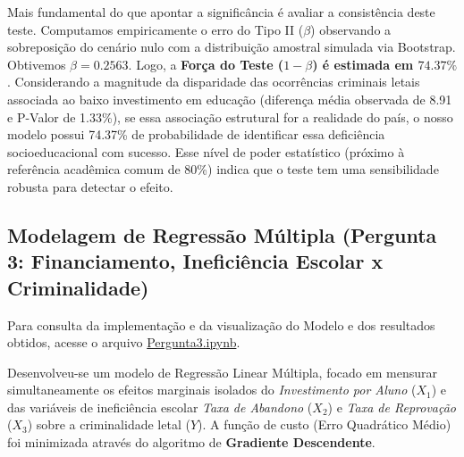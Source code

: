 \documentclass[10pt]{article}
\begin{document}
Mais fundamental do que apontar a significância é avaliar a consistência deste teste. Computamos empiricamente o erro do Tipo II ($\beta$) observando a sobreposição do cenário nulo com a distribuição amostral simulada via Bootstrap. Obtivemos $\beta = 0.2563$. Logo, a \textbf{Força do Teste ($1 - \beta$) é estimada em $74.37\%$}. Considerando a magnitude da disparidade das ocorrências criminais letais associada ao baixo investimento em educação (diferença média observada de 8.91 e P-Valor de 1.33\%), se essa associação estrutural for a realidade do país, o nosso modelo possui 74.37\% de probabilidade de identificar essa deficiência socioeducacional com sucesso. Esse nível de poder estatístico (próximo à referência acadêmica comum de 80\%) indica que o teste tem uma sensibilidade robusta para detectar o efeito.

\subsection{Modelagem de Regressão Múltipla (Pergunta 3: Financiamento, Ineficiência Escolar x Criminalidade) }

Para consulta da implementação e da visualização do Modelo e dos resultados obtidos, acesse o arquivo \href{https://colab.research.google.com/drive/1pVdoor4xno_OC3BWHZh3yFA97_0DO5bY}{Pergunta3.ipynb}.

Desenvolveu-se um modelo de Regressão Linear Múltipla, focado em mensurar simultaneamente os efeitos marginais isolados do \textit{Investimento por Aluno} ($X_1$) e das variáveis de ineficiência escolar \textit{Taxa de Abandono} ($X_2$) e \textit{Taxa de Reprovação} ($X_3$) sobre a criminalidade letal ($Y$). A função de custo (Erro Quadrático Médio) foi minimizada através do algoritmo de \textbf{Gradiente Descendente}.
\end{document}
